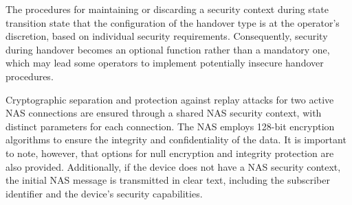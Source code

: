 \documentclass[english]{article}
\begin{document}
The procedures for maintaining or discarding a security context during state
transition state that the configuration of the handover type is at the
operator's discretion, based on individual security requirements. Consequently,
security during handover becomes an optional function rather than a mandatory
one, which may lead some operators to implement potentially insecure handover
procedures.

Cryptographic separation and protection against replay attacks for two active
NAS connections are ensured through a shared NAS security context, with
distinct parameters for each connection. The NAS employs 128-bit encryption
algorithms to ensure the integrity and confidentiality of the data. It is
important to note, however, that options for null encryption and integrity
protection are also provided. Additionally, if the device does not have a NAS
security context, the initial NAS message is transmitted in clear text,
including the subscriber identifier and the device's security capabilities.
\end{document}
